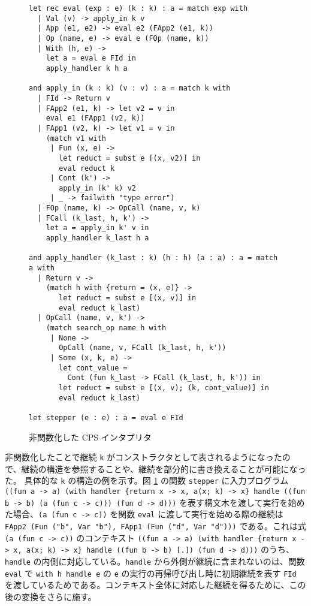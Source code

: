 \begin{figure}
\begin{verbatim}
let rec eval (exp : e) (k : k) : a = match exp with
  | Val (v) -> apply_in k v
  | App (e1, e2) -> eval e2 (FApp2 (e1, k))
  | Op (name, e) -> eval e (FOp (name, k))
  | With (h, e) ->
    let a = eval e FId in
    apply_handler k h a

and apply_in (k : k) (v : v) : a = match k with
  | FId -> Return v
  | FApp2 (e1, k) -> let v2 = v in
    eval e1 (FApp1 (v2, k))
  | FApp1 (v2, k) -> let v1 = v in
    (match v1 with
     | Fun (x, e) ->
       let reduct = subst e [(x, v2)] in
       eval reduct k
     | Cont (k') ->
       apply_in (k' k) v2
     | _ -> failwith "type error")
  | FOp (name, k) -> OpCall (name, v, k)
  | FCall (k_last, h, k') ->
    let a = apply_in k' v in
    apply_handler k_last h a

and apply_handler (k_last : k) (h : h) (a : a) : a = match a with
  | Return v ->
    (match h with {return = (x, e)} ->
       let reduct = subst e [(x, v)] in
       eval reduct k_last)
  | OpCall (name, v, k') ->
    (match search_op name h with
     | None ->
       OpCall (name, v, FCall (k_last, h, k'))
     | Some (x, k, e) ->
       let cont_value =
         Cont (fun k_last -> FCall (k_last, h, k')) in
       let reduct = subst e [(x, v); (k, cont_value)] in
       eval reduct k_last)

let stepper (e : e) : a = eval e FId
\end{verbatim}
\caption{非関数化した CPS インタプリタ}
\label{figure:2defun}
\end{figure}

非関数化したことで継続 \texttt{k} がコンストラクタとして表されるようになったので、継続の構造を参照することや、継続を部分的に書き換えることが可能になった。
具体的な \texttt{k} の構造の例を示す。図 \ref{figure:2defun} の関数 \texttt{stepper} に入力プログラム \texttt{((fun a -> a) (with handler \{return x -> x, a(x; k) -> x\} handle ((fun b -> b) (a (fun c -> c))) (fun d -> d)))} を表す構文木を渡して実行を始めた場合、\texttt{(a (fun c -> c))} を関数 \texttt{eval} に渡して実行を始める際の継続は \texttt{FApp2 (Fun ("b", Var "b"), FApp1 (Fun ("d", Var "d")))} である。これは式 \texttt{(a (fun c -> c))} のコンテキスト \texttt{((fun a -> a) (with handler \{return x -> x, a(x; k) -> x\} handle ((fun b -> b) [.]) (fun d -> d)))} のうち、\texttt{handle} の内側に対応している。\texttt{handle} から外側が継続に含まれないのは、関数 \texttt{eval} で \texttt{with h handle e} の \texttt{e} の実行の再帰呼び出し時に初期継続を表す \texttt{FId} を渡しているためである。コンテキスト全体に対応した継続を得るために、この後の変換をさらに施す。

